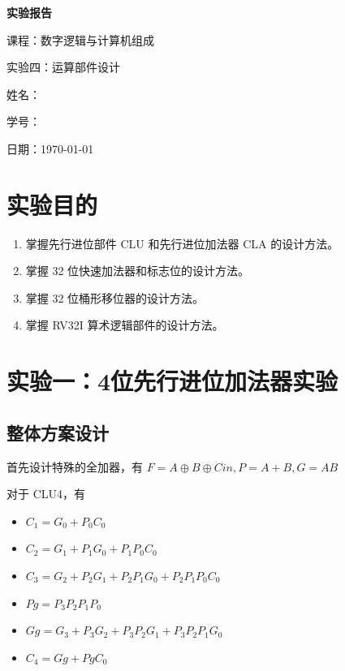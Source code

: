 \documentclass[12pt, a4paper]{ctexart}
\begin{document}
\begin{titlepage}
    \centering
    \vspace*{5cm}
    {\Huge\bfseries 实验报告\par}
    \vspace{2cm}
    {\Large 课程：数字逻辑与计算机组成\par}
    \vspace{1cm}
    {\Large 实验四：运算部件设计\par}
    \vspace{4cm}
    {\large 姓名：\underline{}\par}
    \vspace{1cm}
    {\large 学号：\underline{}\par}
    \vspace{1cm}
    {\large 日期：\today\par}
\end{titlepage}

\tableofcontents
\enlargethispage{\baselineskip}
\newpage

\section{实验目的}

\begin{enumerate}
    \item 掌握先行进位部件 CLU 和先行进位加法器 CLA 的设计方法。
    \item 掌握 32 位快速加法器和标志位的设计方法。
    \item 掌握 32 位桶形移位器的设计方法。
    \item 掌握 RV32I 算术逻辑部件的设计方法。
\end{enumerate}

\section{实验一：4位先行进位加法器实验}

\subsection{整体方案设计}

首先设计特殊的全加器，有 $F=A\oplus B\oplus Cin,P=A+B,G=AB$

对于 CLU4，有

\begin{itemize}
    \item $C_1=G_0+P_0C_0$
    \item $C_2=G_1+P_1G_0+P_1P_0C_0$
    \item $C_3=G_2+P_2G_1+P_2P_1G_0+P_2P_1P_0C_0$
    \item $Pg=P_3P_2P_1P_0$
    \item $Gg=G_3+P_3G_2+P_3P_2G_1+P_3P_2P_1G_0$
    \item $C_4=Gg+PgC_0$
\end{itemize}
\end{document}
